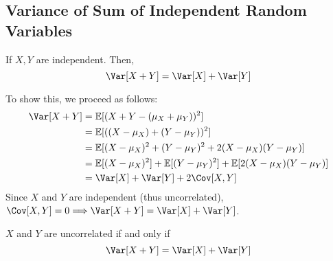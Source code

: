 \newpage
\subsection{Variance of Sum of Independent Random Variables}
\begin{theorem}
    If \(X, Y\) are independent. Then, 
    \[
        \Var[X + Y] = \Var[X] + \Var[Y]
    \]
\end{theorem}

To show this, we proceed as follows: 
\[
    \begin{aligned}
        \Var[X + Y] &= \mathbb{E}[(X + Y - (\mu_X + \mu_Y))^2] \\
        &= \mathbb{E}[((X - \mu_X) + (Y - \mu_Y))^2] \\
        &= \mathbb{E}[(X - \mu_X)^2 + (Y - \mu_Y)^2 + 2(X - \mu_X)(Y - \mu_Y)] \\
        &= \mathbb{E}[(X - \mu_X)^2] + \mathbb{E}[(Y - \mu_Y)^2] + \mathbb{E}[2(X - \mu_X)(Y - \mu_Y)] \\
        &= \Var[X] + \Var[Y] + 2\Cov[X, Y] \\
    \end{aligned}
\]
Since \(X\) and \(Y\) are independent (thus uncorrelated), \(\Cov[X, Y] = 0 \Longrightarrow \Var[X + Y] = \Var[X] + \Var[Y]\). 
\begin{remark}
    \(X\) and \(Y\) are uncorrelated if and only if 
    \[
        \Var[X + Y] = \Var[X] + \Var[Y]
    \]
\end{remark}


